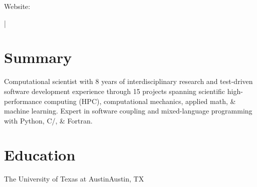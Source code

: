 \documentclass[letterpaper,10pt]{article}
\begin{document}

      \href{\AuthorWebsiteLink}{\scshape\huge\Author}\vspace{2pt}

    \begin{small}
      Website: \href{\AuthorWebsiteLink}{\color[HTML]{0f4cb4}\myuline{\smash{\AuthorWebsiteText}}}

      \vspace{2pt}\AuthorAddress

      \vspace{2pt}\href{mailto:\AuthorEmail}{\AuthorEmail} |
      \href{\AuthorPhoneLink}{\AuthorPhoneText}

    \end{small}

\section{Summary}
\vspace{-2pt}
Computational scientist with 8 years of interdisciplinary research and
test-driven software development experience through 15\smallplus{} projects
spanning scientific high-performance computing (HPC), computational mechanics,
applied math, \& machine learning. Expert in software coupling
and mixed-language programming with Python, C/\CC{}, \&
Fortran.

\section{Education}
  \resumeSubHeadingListStart

    \resumeSubheading
      {The University of Texas at Austin}{Austin, TX}
\end{document}
